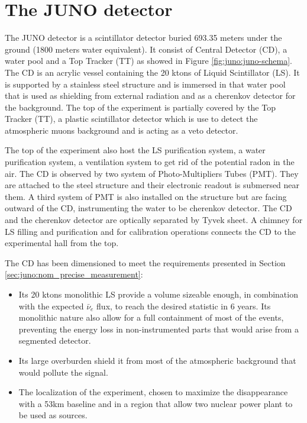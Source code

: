 \documentclass[../main.tex]{subfiles}
\begin{document}
\section{The JUNO detector}
\label{sec:juno:juno_detector}

The JUNO detector is a scintillator detector buried 693.35 meters under the ground (1800 meters water equivalent). It consist of Central Detector (CD), a water pool and a Top Tracker (TT) as showed in Figure \ref{fig:juno:juno-schema}.
The CD is an acrylic vessel containing the 20 ktons of Liquid Scintillator (LS). It is supported by a stainless steel structure and is immersed in that water pool that is used as shielding from external radiation and as a cherenkov detector for the background. The top of the experiment is partially covered by the Top Tracker (TT), a plastic scintillator detector which is use to detect the atmospheric muons background and is acting as a veto detector.


The top of the experiment also host the LS purification system, a water purification system, a ventilation system to get rid of the potential radon in the air.
The CD is observed by two system of Photo-Multipliers Tubes (PMT). They are attached to the steel structure and their electronic readout is submersed near them. A third system of PMT is also installed on the structure but are facing outward of the CD, instrumenting the water to be cherenkov detector. The CD and the cherenkov detector are optically separated by Tyvek sheet. A chimney for LS filling and purification and for calibration operations connects the CD to the experimental hall from the top.

The CD has been dimensioned to meet the requirements presented in Section \ref{sec:juno:nom_precise_measurement}:
\begin{itemize}
  \item Its 20 ktons monolithic LS provide a volume sizeable enough, in combination with the expected $\bar{\nu}_e$ flux, to reach the desired statistic in 6 years. Its monolithic nature also allow for a full containment of most of the events, preventing the energy loss in non-instrumented parts that would arise from a segmented detector.
  \item Its large overburden shield it from most of the atmospheric background that would pollute the signal.
  \item The localization of the experiment, chosen to maximize the disappearance with a 53km baseline and in a region that allow two nuclear power plant to be used as sources.
\end{itemize}
\end{document}

